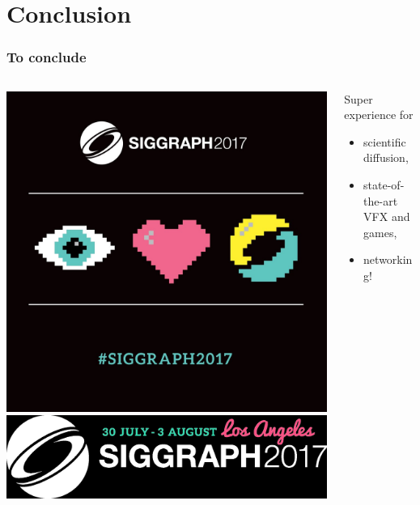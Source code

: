 \section{Conclusion}
\frame
{
	\frametitle{To conclude}
	
	
	\begin{minipage}[0.2\textheight]{\textwidth}
		\begin{columns}[T]
			
			\begin{column}{0.4\textwidth}
				\includegraphics[width=\textwidth]{img/siggraph2017.jpg}\\
				\includegraphics[width=\textwidth]{img/s2017.png}
			\end{column}
			\begin{column}{0.5\textwidth}
				\vspace{2cm}
				Super experience for 
				\begin{itemize}
					\item scientific diffusion, 
					\item state-of-the-art VFX and games, 
					\item networking!
				\end{itemize}
			\end{column}
		\end{columns}
	\end{minipage}
}


